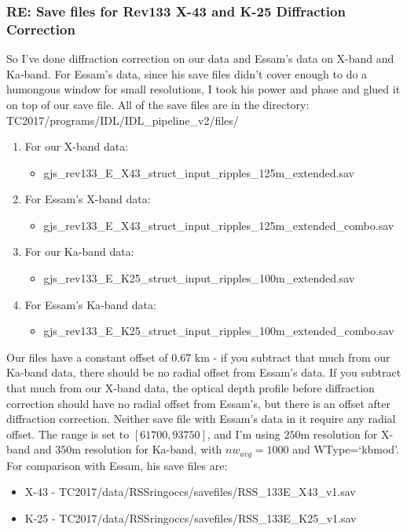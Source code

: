 \documentclass[crop=false,class=book]{standalone}
\begin{document}
\subsubsection{RE: Save files for Rev133 X-43 and K-25 Diffraction Correction}
So I’ve done diffraction correction on our data and Essam’s data on X-band and Ka-band. For Essam’s data, since his save files didn’t cover enough to do a humongous window for small resolutions, I took his power and phase and glued it on top of our save file. All of the save files are in the directory: TC2017/programs/IDL/IDL\_pipeline\_v2/files/
\begin{enumerate}
    \item For our X-band data:
    \begin{itemize}
        \item gjs\_rev133\_E\_X43\_struct\_input\_ripples\_125m\_extended.sav
    \end{itemize}
        \item For Essam’s X-band data:
    \begin{itemize}
        \item gjs\_rev133\_E\_X43\_struct\_input\_ripples\_125m\_extended\_combo.sav
    \end{itemize}
    \item For our Ka-band data:
    \begin{itemize}
        \item gjs\_rev133\_E\_K25\_struct\_input\_ripples\_100m\_extended.sav 
    \end{itemize}
    \item For Essam’s Ka-band data:
    \begin{itemize}
        \item gjs\_rev133\_E\_K25\_struct\_input\_ripples\_100m\_extended\_combo.sav
    \end{itemize}
\end{enumerate}
Our files have a constant offset of 0.67 km - if you subtract that much from our Ka-band data, there should be no radial offset from Essam’s data. If you subtract that much from our X-band data, the optical depth profile before diffraction correction should have no radial offset from Essam's, but there is an offset after diffraction correction. Neither save file with Essam’s data in it require any radial offset. The range is set to $[61700, 93750]$, and I’m using $250$m resolution for X-band and $350$m resolution for Ka-band, with $nw_{avg} = 1000$ and WType=‘kbmod'. For comparison with Essam, his save files are:
\begin{itemize}
    \item X-43 - TC2017/data/RSSringoccs/savefiles/RSS\_133E\_X43\_v1.sav
    \item K-25 - TC2017/data/RSSringoccs/savefiles/RSS\_133E\_K25\_v1.sav
\end{itemize}
\end{document}
